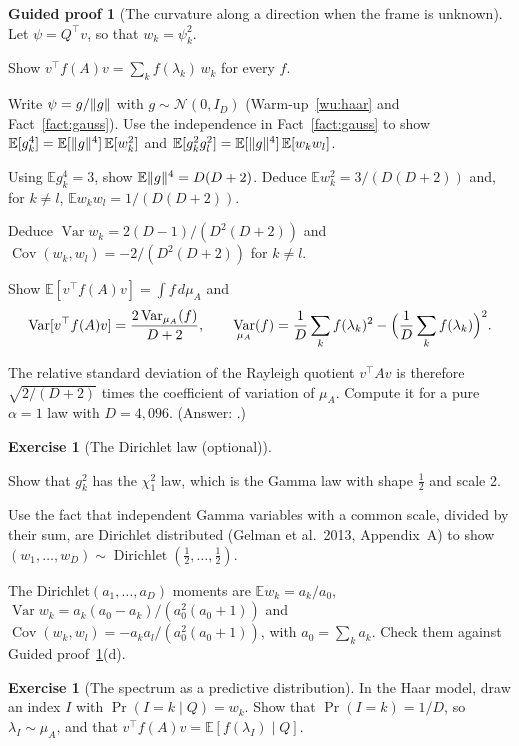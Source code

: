 \documentclass[11pt,a4paper]{article}
\newcommand{\E}{\mathbb{E}}
\DeclareMathOperator{\Var}{Var}
\DeclareMathOperator{\Cov}{Cov}
\DeclareMathOperator{\Dir}{Dirichlet}
\DeclarePairedDelimiter{\norm}{\lVert}{\rVert}
\theoremstyle{plain}
\theoremstyle{definition}
\newtheorem{exercise}[proposition]{Exercise}
\newtheorem{guided}[proposition]{Guided proof}
\theoremstyle{remark}
\begin{document}
\begin{guided}[The curvature along a direction when the frame is unknown]\label{gp:haar}
Let $\psi=Q^\top v$, so that $w_k=\psi_k^2$.
\begin{steps}
\item Show $v^\top f(A)v=\sum_kf(\lambda_k)\,w_k$ for every $f$.
\item Write $\psi=g/\norm{g}$ with $g\sim\mathcal{N}(0,I_D)$ (Warm-up~\ref{wu:haar} and Fact~\ref{fact:gauss}). Use the
  independence in Fact~\ref{fact:gauss} to show $\E[g_k^4]=\E[\norm{g}^4]\,\E[w_k^2]$ and
  $\E[g_k^2g_l^2]=\E[\norm{g}^4]\,\E[w_kw_l]$.
\item Using $\E g_k^4=3$, show $\E\norm{g}^4=D(D+2)$. Deduce $\E w_k^2=3/(D(D+2))$ and, for $k\ne l$,
  $\E w_kw_l=1/(D(D+2))$.
\item Deduce $\Var w_k=2(D-1)/(D^2(D+2))$ and $\Cov(w_k,w_l)=-2/(D^2(D+2))$ for $k\ne l$.
\item\label{st:haar-var} Show $\E[v^\top f(A)v]=\int f\,d\mu_A$ and
  \[\Var[v^\top f(A)v]=\frac{2\Var_{\mu_A}(f)}{D+2},\qquad\Var_{\mu_A}(f)=\frac1D\sum_kf(\lambda_k)^2-\Bigl(\frac1D\sum_kf(\lambda_k)\Bigr)^2.\]
\item The relative standard deviation of the Rayleigh quotient $v^\top Av$ is therefore
  $\sqrt{2/(D+2)}$ times the coefficient of variation of $\mu_A$. Compute it for a pure $\alpha=1$ law with
  $D=4{,}096$. (Answer: \NumHaarRelSd.)
\end{steps}
\end{guided}

\begin{exercise}[The Dirichlet law (optional)]\label{ex:dirichlet}
\begin{steps}
\item Show that $g_k^2$ has the $\chi^2_1$ law, which is the Gamma law with shape $\frac12$ and scale 2.
\item Use the fact that independent Gamma variables with a common scale, divided by their sum, are Dirichlet
  distributed (Gelman et al.\ 2013, Appendix~A) to show $(w_1,\dots,w_D)\sim\Dir(\frac12,\dots,\frac12)$.
\item The Dirichlet$(a_1,\dots,a_D)$ moments are $\E w_k=a_k/a_0$, $\Var w_k=a_k(a_0-a_k)/(a_0^2(a_0+1))$ and
  $\Cov(w_k,w_l)=-a_ka_l/(a_0^2(a_0+1))$, with $a_0=\sum_ka_k$. Check them against Guided proof~\ref{gp:haar}(d).
\end{steps}
\end{exercise}

\begin{exercise}[The spectrum as a predictive distribution]\label{ex:mixture}
In the Haar model, draw an index $I$ with $\Pr(I=k\mid Q)=w_k$. Show that $\Pr(I=k)=1/D$, so $\lambda_I\sim\mu_A$, and
that $v^\top f(A)v=\E[f(\lambda_I)\mid Q]$.
\end{exercise}
\end{document}
